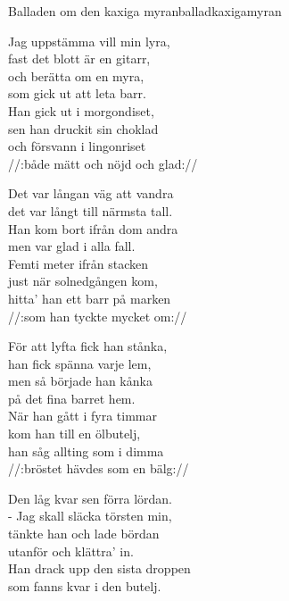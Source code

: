 \newpage

\begin{song}{Balladen om den kaxiga myran}{balladkaxigamyran}
\begin{vers}
Jag uppstämma vill min lyra,\\
fast det blott är en gitarr,\\
och berätta om en myra,\\
som gick ut att leta barr.\\
Han gick ut i morgondiset,\\
sen han druckit sin choklad\\
och försvann i lingonriset\\
//:både mätt och nöjd och glad://\\
\end{vers}
\begin{vers}
Det var långan väg att vandra\\
det var långt till närmsta tall.\\
Han kom bort ifrån dom andra\\
men var glad i alla fall.\\
Femti meter ifrån stacken\\
just när solnedgången kom,\\
hitta' han ett barr på marken\\
//:som han tyckte mycket om://\\
\end{vers}
\begin{vers}
För att lyfta fick han stånka,\\
han fick spänna varje lem,\\
men så började han kånka\\
på det fina barret hem.\\
När han gått i fyra timmar\\
kom han till en ölbutelj,\\
han såg allting som i dimma\\
//:bröstet hävdes som en bälg://\\
\end{vers}
\begin{vers}
Den låg kvar sen förra lördan.\\
- Jag skall släcka törsten min,\\
tänkte han och lade bördan\\
utanför och klättra' in.\\
Han drack upp den sista droppen\\
som fanns kvar i den butelj.\\

\end{vers}
\end{song}
